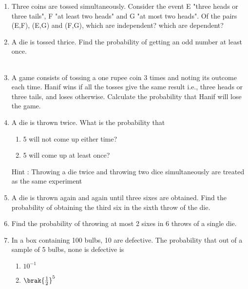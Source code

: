 \begin{enumerate}[label=\arabic*.,ref=\thesubsection.\theenumi]
\item Three coins are tossed simultaneously. Consider the event E "three heads or three tails", F "at least two heads" and G "at most two heads". Of the pairs (E,F), (E,G) and (F,G), which are independent? which are dependent?\\
\solution

\item A die is tossed thrice. Find the probability of getting an odd number at least once.\\
\\
\solution

\item A game consists of tossing a one rupee coin 3 times and noting its outcome each time. Hanif wins if all the tosses give the same result i.e., three heads or three tails, and loses otherwise. Calculate the probability that Hanif will lose the game.
\\
\solution

\item A die is thrown twice. What is the probability that\\
\begin{enumerate}[label=(\roman*)]
\item  5 will not come up either time? \\
\item  5 will come up at least once?\\
\end{enumerate}
Hint : Throwing a die twice and throwing two dice simultaneously are treated as the
same experiment
\\
\solution

\item A die is thrown again and again until three sixes are obtained. Find the probability of obtaining the third six in the sixth throw of the die.\\
\solution

%
\item Find the probability of throwing at most 2 sixes in 6 throws of a single die.\\
\solution

%
\item In a box containing 100 bulbs, 10 are defective. The probability that out of a
sample of 5 bulbs, none is defective is
\begin{enumerate}
\item $10^{-1}$
\item $\brak{\frac{1}{2}}^5$

\end{enumerate}
\end{enumerate}
